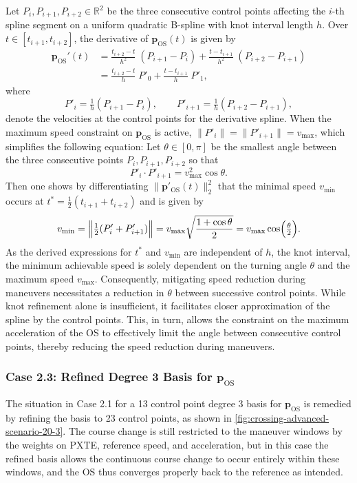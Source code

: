 Let $P_i,P_{i+1},P_{i+2}\in\mathbb R^2$ be the three consecutive control points affecting the $i$-th spline segment on a uniform quadratic B-spline with knot interval length $h$.  Over $t\in[t_{i+1}, t_{i+2}]$, the derivative of $\mathbf p_\text{OS}(t)$ is given by
\begin{equation}
    \begin{aligned}
        \mathbf p_\text{OS}'(t) 
        &=\frac{t_{i+2}-t}{h^2}\;(P_{i+1}-P_i) 
        +\frac{t - t_{i+1}}{h^2}\;(P_{i+2}-P_{i+1})\\
        &=\frac{t_{i+2}-t}{h}\;P'_0
        +\frac{t - t_{i+1}}{h}\;P'_1,
    \end{aligned}
\end{equation}
where
\begin{equation}
P'_i = \tfrac1h (P_{i+1} - P_i),
\qquad
P'_{i+1} = \tfrac1h(P_{i+2} - P_{i+1}),
\end{equation}
denote the velocities at the control points for the derivative spline. When the maximum speed constraint on $\mathbf p_\text{OS}$ is active, $\|P'_i\|=\|P'_{i+1}\|=v_{\max}$, which simplifies the following equation:  Let $\theta\in[0,\pi]$ be the smallest angle between the three consecutive points $P_i,P_{i+1},P_{i+2}$ so that
\begin{equation}
P'_i\cdot P'_{i+1} = v_{\max}^2\cos\theta.
\end{equation}
Then one shows by differentiating $\|\mathbf p'_\text{OS}(t)\|_2^2$ that the minimal speed $v_{\min}$ occurs at $t^*=\tfrac12(t_{i+1}+t_{i+2})$ and is given by
\begin{equation}
v_{\min}
=\Bigl\|\tfrac12(P'_i+P'_{i+1})\Bigr\|
=v_{\max}\sqrt{\frac{1+\cos\theta}{2}}
=v_{\max}\cos\Bigl(\tfrac\theta2\Bigr).
\end{equation}
As the derived expressions for $t^*$ and $v_{\min}$ are independent of $h$, the knot interval, the minimum achievable speed is solely dependent on the turning angle $\theta$ and the maximum speed $v_{\max}$. Consequently, mitigating speed reduction during maneuvers necessitates a reduction in $\theta$ between successive control points. While knot refinement alone is insufficient, it facilitates closer approximation of the spline by the control points. This, in turn, allows the constraint on the maximum acceleration of the OS to effectively limit the angle between consecutive control points, thereby reducing the speed reduction during maneuvers.


\subsubsection{Case 2.3: Refined Degree 3 Basis for $\mathbf p_\text{OS}$}
The situation in Case 2.1 for a 13 control point degree 3 basis for $\mathbf p_\text{OS}$ is remedied by refining the basis to 23 control points, as shown in \cref{fig:crossing-advanced-scenario-20-3}. The course change is still restricted to the maneuver windows by the weights on PXTE, reference speed, and acceleration, but in this case the refined basis allows the continuous course change to occur entirely within these windows, and the OS thus converges properly back to the reference as intended.


